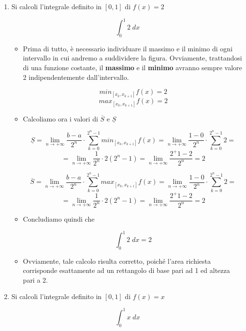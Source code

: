 \documentclass[a4paper, 12pt]{report}
\begin{document}
    \begin{enumerate}
        \item Si calcoli l'integrale definito in $[0, 1]$ di $f(x) = 2$
        
        \[ \int_{0}^{1} 2 \; dx\]
        
        \begin{itemize}
            \item Prima di tutto, è necessario individuare il massimo e il minimo di ogni intervallo in cui andremo a suddividere la figura. Ovviamente, trattandosi di una funzione costante, il \textbf{massimo} e il \textbf{minimo} avranno sempre valore 2 indipendentemente dall'intervallo.
            
            \[min_{[x_k, x_{k+1}]} f(x) = 2\]
            \[max_{[x_k, x_{k+1}]} f(x) = 2\]
            
            \item Calcoliamo ora i valori di $\overline{S}$ e $\underline{S}$
            
            \[ \underline{S} = \lim_{n \to +\infty} \frac{b-a}{2^n} \cdot \sum_{k=0}^{2^n-1} min_{[x_k, x_{k+1}]} f(x) = \lim_{n \to +\infty} \frac{1-0}{2^n} \cdot \sum_{k=0}^{2^n-1} 2 =\]
            \[ = \lim_{n \to +\infty} \frac{1}{2^n} \cdot 2(2^n-1) = \lim_{n \to +\infty} \frac{2^+1 - 2}{2^n} = 2\]
            
            \[ \overline{S} = \lim_{n \to +\infty} \frac{b-a}{2^n} \cdot \sum_{k=0}^{2^n-1} max_{[x_k, x_{k+1}]} f(x) = \lim_{n \to +\infty} \frac{1-0}{2^n} \cdot \sum_{k=0}^{2^n-1} 2 =\]
            \[ = \lim_{n \to +\infty} \frac{1}{2^n} \cdot 2(2^n-1) = \lim_{n \to +\infty} \frac{2^+1 - 2}{2^n} = 2\]
            
            \item Concludiamo quindi che 
            
            \[ \int_{0}^{1} 2 \; dx = 2\]
            
            \item Ovviamente, tale calcolo risulta corretto, poiché l'area richiesta corrisponde esattamente ad un rettangolo di base pari ad 1 ed altezza pari a 2. 
        \end{itemize}
        
        \newpage
        
        \item Si calcoli l'integrale definito in $[0, 1]$ di $f(x) = x$
        
        \[ \int_{0}^{1} x \; dx\]
        

\end{enumerate}
\end{document}
